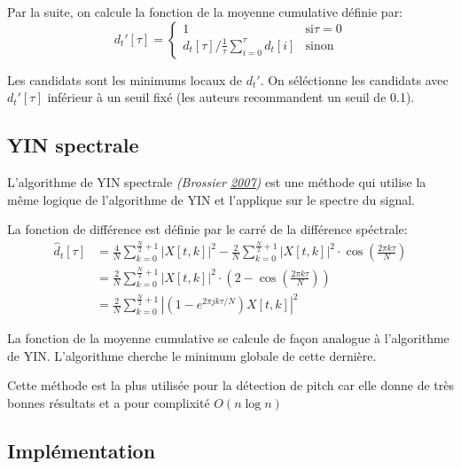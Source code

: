 \documentclass[french,]{article}
\begin{document}
Par la suite, on calcule la fonction de la moyenne cumulative définie
par: \[d_t'[\tau] = \begin{cases} 1 &\text{si} \tau = 0\\
d_t[\tau] / \frac{1}{\tau}\sum\limits_{i=0}^{\tau}d_t[i] &\text{sinon}
\end{cases}\]

Les candidats sont les minimums locaux de \(d_t'\). On séléctionne les
candidats avec \(d_t'[\tau]\) inférieur à un seuil fixé (les auteurs
recommandent un seuil de 0.1).

\hypertarget{yin-spectrale}{%
\subsection{YIN spectrale}\label{yin-spectrale}}

L'algorithme de YIN spectrale \emph{(Brossier
\protect\hyperlink{ref-yinfft}{2007})} est une méthode qui utilise la
même logique de l'algorithme de YIN et l'applique sur le spectre du
signal.

La fonction de différence est définie par le carré de la différence
spéctrale: \begin{align*}
\hat{d}_t[\tau] &= \frac{4}{N} \sum\limits_{k=0}^{\frac{N}{2}+1} \left\lvert X[t,k] \right\rvert^2
       - \frac{2}{N} \sum\limits_{k=0}^{\frac{N}{2}+1} \left\lvert X[t,k] \right\rvert^2
       \cdot \cos \left( \frac{2\pi k\tau}{N} \right) \\
    &= \frac{2}{N} \sum\limits_{k=0}^{\frac{N}{2}+1} \left\lvert X[t,k] \right\rvert^2
       \cdot \left( 2 - \cos \left( \frac{2\pi k\tau}{N} \right) \right) \\
    &= \frac{2}{N} \sum\limits_{k=0}^{\frac{N}{2}+1}
       \left\lvert\left( 1-e^{2\pi jk\tau/N} \right) X[t,k] \right\rvert^2
\end{align*}

La fonction de la moyenne cumulative se calcule de façon analogue à
l'algorithme de YIN. L'algorithme cherche le minimum globale de cette
dernière.

Cette méthode est la plus utilisée pour la détection de pitch car elle
donne de très bonnes résultats et a pour complixité \(O(n\log n)\)

\hypertarget{implementation-1}{%
\subsection{Implémentation}\label{implementation-1}}
\end{document}
